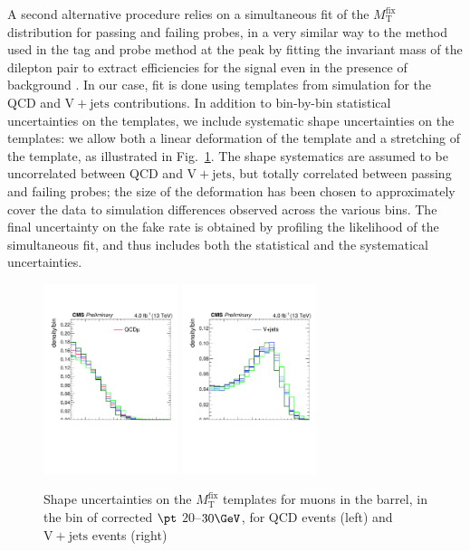 A second alternative procedure relies on a simultaneous fit of the $M_\mathrm{T}^{\mathrm{fix}}$ distribution for passing and failing probes, in a very similar way to the method used in the tag and probe method at the \Z peak by fitting the invariant mass of the dilepton pair to extract efficiencies for the signal even in the presence of background . In our case, fit is done using templates from simulation for the QCD and $\mathrm{V}+\mathrm{jets}$ contributions. In addition to bin-by-bin statistical uncertainties on the templates, we include systematic shape uncertainties on the templates: we allow both a linear deformation of the template and a stretching of the template, as illustrated in Fig.~\ref{fig:frmeas-shapesyst}. The shape systematics are assumed to be uncorrelated between QCD and $\mathrm{V}+\mathrm{jets}$, but totally correlated between passing and failing probes; the size of the deformation has been chosen to approximately cover the data to simulation differences observed across the various bins. The final uncertainty on the fake rate is obtained by profiling the likelihood of the simultaneous fit, and thus includes both the statistical and the systematical uncertainties.
\begin{figure}[htb]
	\centering 
\includegraphics[width=0.35\textwidth]{plots_fakerate/measurement/mu_fitSimND_bin_20_30_pass_sigSyst}
\includegraphics[width=0.35\textwidth]{plots_fakerate/measurement/mu_fitSimND_bin_20_30_pass_bkgSyst}
	\caption{Shape uncertainties on the $M_\mathrm{T}^{\mathrm{fix}}$ templates for muons in the barrel, in the bin of corrected $\pt$ $20$--$30\GeV$, for QCD events (left) and $\mathrm{V}+\mathrm{jets}$ events (right)}
	\label{fig:frmeas-shapesyst}
\end{figure}


